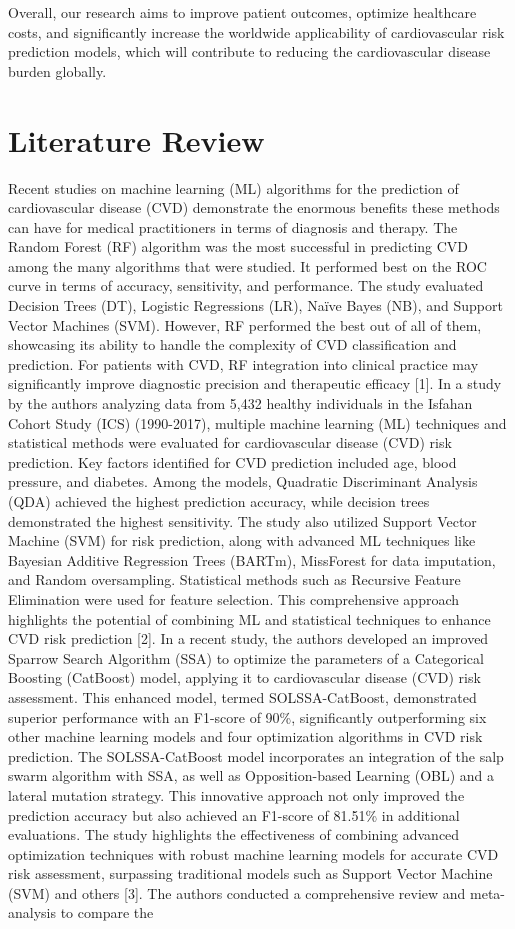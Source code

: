 \documentclass[conference]{IEEEtran}
\begin{document}
Overall, our research aims to improve patient outcomes, optimize healthcare costs, and significantly increase the worldwide applicability of cardiovascular risk prediction models, which will contribute to reducing the cardiovascular disease burden globally.


\section{Literature Review}
Recent studies on machine learning (ML) algorithms for the prediction of cardiovascular disease (CVD) demonstrate the enormous benefits these methods can have for medical practitioners in terms of diagnosis and therapy. The Random Forest (RF) algorithm was the most successful in predicting CVD among the many algorithms that were studied. It performed best on the ROC curve in terms of accuracy, sensitivity, and performance. The study evaluated Decision Trees (DT), Logistic Regressions (LR), Naïve Bayes (NB), and Support Vector Machines (SVM). However, RF performed the best out of all of them, showcasing its ability to handle the complexity of CVD classification and prediction. For patients with CVD, RF integration into clinical practice may significantly improve diagnostic precision and therapeutic efficacy [1]. In a study by the authors analyzing data from 5,432 healthy individuals in the Isfahan Cohort Study (ICS) (1990-2017), multiple machine learning (ML) techniques and statistical methods were evaluated for cardiovascular disease (CVD) risk prediction. Key factors identified for CVD prediction included age, blood pressure, and diabetes. Among the models, Quadratic Discriminant Analysis (QDA) achieved the highest prediction accuracy, while decision trees demonstrated the highest sensitivity. The study also utilized Support Vector Machine (SVM) for risk prediction, along with advanced ML techniques like Bayesian Additive Regression Trees (BARTm), MissForest for data imputation, and Random oversampling. Statistical methods such as Recursive Feature Elimination were used for feature selection. This comprehensive approach highlights the potential of combining ML and statistical techniques to enhance CVD risk prediction [2]. In a recent study, the authors developed an improved Sparrow Search Algorithm (SSA) to optimize the parameters of a Categorical Boosting (CatBoost) model, applying it to cardiovascular disease (CVD) risk assessment. This enhanced model, termed SOLSSA-CatBoost, demonstrated superior performance with an F1-score of 90\%, significantly outperforming six other machine learning models and four optimization algorithms in CVD risk prediction. The SOLSSA-CatBoost model incorporates an integration of the salp swarm algorithm with SSA, as well as Opposition-based Learning (OBL) and a lateral mutation strategy. This innovative approach not only improved the prediction accuracy but also achieved an F1-score of 81.51\% in additional evaluations. The study highlights the effectiveness of combining advanced optimization techniques with robust machine learning models for accurate CVD risk assessment, surpassing traditional models such as Support Vector Machine (SVM) and others [3]. The authors conducted a comprehensive review and meta-analysis to compare the 
\end{document}
